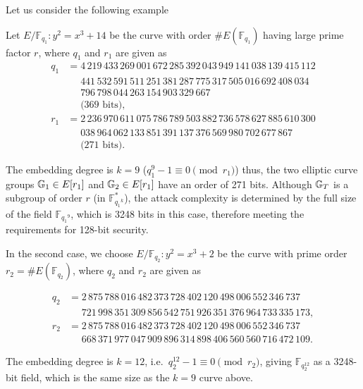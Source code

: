 
Let us consider the following example 


\begin{example}
	Let $E/\mathbb{F}_{q_1} : y^2 = x^3 + 14$ be the curve with order $\#E(\mathbb{F}_{q_1})$ having large prime factor $r$, where $q_1$ and $r_1$ are given as
		\begin{align*}
		q_1
		&= 4\,219\,433\,269\,001\,672\,285\,392\,043\,949\,141\,038\,139\,415\,112\\
		&\phantom{{}={}}
		441\,532\,591\,511\,251\,381\,287\,775\,317\,505\,016\,692\,408\,034\\
		&\phantom{{}={}}
		796\,798\,044\,263\,154\,903\,329\,667\\
		&\phantom{{}={}}\text{(369 bits)},\\[1ex]
		r_1
		&= 2\,236\,970\,611\,075\,786\,789\,503\,882\,736\,578\,627\,885\,610\,300\\
		&\phantom{{}={}}
		038\,964\,062\,133\,851\,391\,137\,376\,569\,980\,702\,677\,867\\
		&\phantom{{}={}}\text{(271 bits)}.
	\end{align*}
	
	The embedding degree is $k = 9$ ($q_1^9 - 1 \equiv 0 \pmod{r_1}$) thus, the two elliptic curve groups $\mathbb{G}_1 \in E[r_1]$ and $\mathbb{G}_2 \in E[r_1]$ have an order of 271 bits. Although $\mathbb{G}_T$ is a subgroup of order $r$ (in $\mathbb{F}_{{q_1}^k}^*$), the attack complexity is determined by the full size of the field $\mathbb{F}_{{q_1}^9}$, which is 3248 bits in this case, therefore meeting the requirements for 128-bit security.
	
	In the second case, 
	we choose $E/\mathbb{F}_{q_2} : y^2 = x^3 + 2$ be the curve with prime order $r_2 = \#E(\mathbb{F}_{q_2})$, where $q_2$ and $r_2$ are given as
	

\begin{align*}
	q_2
	&= 2\,875\,788\,016\,482\,373\,728\,402\,120\,498\,006\,552\,346\,737\\
	&\phantom{{}={}}
	721\,998\,351\,309\,856\,542\,751\,926\,351\,376\,964\,733\,335\,173,\\
	r_2
	&= 2\,875\,788\,016\,482\,373\,728\,402\,120\,498\,006\,552\,346\,737\\
	&\phantom{{}={}}
	668\,371\,977\,047\,909\,896\,314\,898\,406\,560\,560\,716\,472\,109.
\end{align*}

	
	The embedding degree is $k = 12$, i.e.\ $q_2^{12} - 1 \equiv 0 \pmod{r_2}$, giving $\mathbb{F}_{q_2^{12}}$ as a 3248-bit field, which is the same size as the $k = 9$ curve above. 
	\label{example:411}
\end{example}


